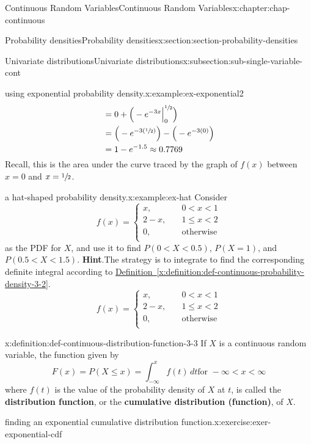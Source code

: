 \documentclass[oneside,10pt,]{book}
\newcommand{\blocktitlefont}{\relax}
\newcommand{\xreffont}{\relax}
\newcommand{\terminology}[1]{\textbf{#1}}
\newcommand{\lt}{<}
\newcommand{\amp}{&}
\begin{document}
\begin{chapterptx}{Continuous Random Variables}{}{Continuous Random Variables}{}{}{x:chapter:chap-continuous}
\begin{sectionptx}{Probability densities}{}{Probability densities}{}{}{x:section:section-probability-densities}
\begin{subsectionptx}{Univariate distributions}{}{Univariate distributions}{}{}{x:subsection:sub-single-variable-cont}
\begin{example}{using exponential probability density.}{x:example:ex-exponential2}
\begin{equation*}
\begin{aligned}[t]
\amp = 0 + \Big(-e^{-3x}\Big|_0^{\sfrac{1}{2}}\Big) \\
\amp = \Big(-e^{-3(\sfrac{1}{2})}\Big) - \Big(-e^{-3(0)}\Big) \\
\amp = 1- e^{-1.5} \approx 0.7769
\end{aligned}
\end{equation*}
Recall, this is the area under the curve traced by the graph of \(f(x)\) between \(x=0\) and \(x=\sfrac{1}{2}\).%
\end{example}
\begin{example}{a hat-shaped probability density.}{x:example:ex-hat}%
Consider%
\begin{equation*}
f(x) = \begin{cases}x,
\amp \quad 0 \lt x \lt 1\\
2-x, \amp \quad 1 \le x \lt 2\\
0, \amp \quad \text{otherwise}\\
\end{cases}
\end{equation*}
as the PDF for \(X\), and use it to find \(P(0 \lt X \lt 0.5)\), \(P(X=1)\), and \(P(0.5 \lt X \lt
1.5)\).%
\textbf{\blocktitlefont Hint}.\quad{}The strategy is to integrate to find the corresponding definite integral according to \hyperref[x:definition:def-continuous-probability-density-3-2]{Definition~{\xreffont\ref{x:definition:def-continuous-probability-density-3-2}}}.%
\begin{equation*}
f(x) = \begin{cases}x,
\amp \quad 0 \lt x \lt 1\\
2-x, \amp \quad 1 \le x \lt 2\\
0, \amp \quad \text{otherwise}\\
\end{cases}
\end{equation*}
%
\end{example}
\begin{definition}{}{x:definition:def-continuous-distribution-function-3-3}%
If \(X\) is a continuous random variable, the function given by%
\begin{equation*}
\displaystyle F(x) = P(X \le x) = \int_{-\infty}^x f(t) \,dt \text{
for } -\infty \lt x
\lt \infty
\end{equation*}
where \(f(t)\) is the value of the probability density of \(X\) at \(t\), is called the \terminology{distribution function}, or the \terminology{cumulative distribution (function)}, of \(X\).%
\end{definition}
\begin{inlineexercise}{finding an exponential cumulative distribution function.}{x:exercise:exer-exponential-cdf}%

\end{inlineexercise}
\end{subsectionptx}
\end{sectionptx}
\end{chapterptx}
\end{document}

